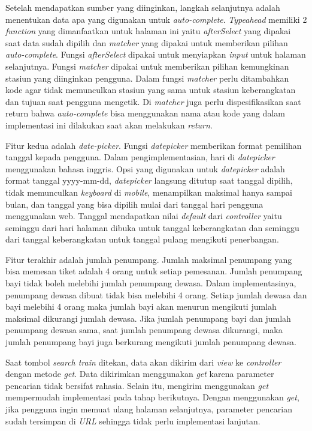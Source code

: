 Setelah mendapatkan sumber yang diinginkan, langkah selanjutnya adalah menentukan data apa yang digunakan untuk \textit{auto-complete}. \textit{Typeahead} memiliki 2 \textit{function} yang dimanfaatkan untuk halaman ini yaitu \textit{afterSelect} yang dipakai saat data sudah dipilih dan \textit{matcher} yang dipakai untuk memberikan pilihan \textit{auto-complete}. Fungsi \textit{afterSelect} dipakai untuk menyiapkan \textit{input} untuk halaman selanjutnya. Fungsi \textit{matcher} dipakai untuk memberikan pilihan kemungkinan stasiun yang diinginkan pengguna. Dalam fungsi \textit{matcher} perlu ditambahkan kode agar tidak memunculkan stasiun yang sama untuk stasiun keberangkatan dan tujuan saat pengguna mengetik. Di \textit{matcher} juga perlu dispesifikasikan saat return bahwa \textit{auto-complete} bisa menggunakan nama atau kode yang dalam implementasi ini dilakukan saat akan melakukan \textit{return}.

Fitur kedua adalah \textit{date-picker}. Fungsi \textit{datepicker} memberikan format pemilihan tanggal kepada pengguna. Dalam pengimplementasian, hari di \textit{datepicker} menggunakan bahasa inggris. Opsi yang digunakan untuk \textit{datepicker} adalah format tanggal yyyy-mm-dd, \textit{datepicker} langsung ditutup saat tanggal dipilih, tidak memunculkan \textit{keyboard} di \textit{mobile}, menampilkan maksimal hanya sampai bulan, dan tanggal yang bisa dipilih mulai dari tanggal hari pengguna menggunakan web. Tanggal mendapatkan nilai \textit{default} dari \textit{controller} yaitu seminggu dari hari halaman dibuka untuk tanggal keberangkatan dan seminggu dari tanggal keberangkatan untuk tanggal pulang mengikuti penerbangan.

Fitur terakhir adalah jumlah penumpang. Jumlah maksimal penumpang yang bisa memesan tiket adalah 4 orang untuk setiap pemesanan. Jumlah penumpang bayi tidak boleh melebihi jumlah penumpang dewasa. Dalam implementasinya, penumpang dewasa dibuat tidak bisa melebihi 4 orang. Setiap jumlah dewasa dan bayi melebihi 4 orang maka jumlah bayi akan menurun mengikuti jumlah maksimal dikurangi jumlah dewasa. Jika jumlah penumpang bayi dan jumlah penumpang dewasa sama, saat jumlah penumpang dewasa dikurangi, maka jumlah penumpang bayi juga berkurang mengikuti jumlah penumpang dewasa.

Saat tombol \textit{search train} ditekan, data akan dikirim dari \textit{view} ke \textit{controller} dengan metode \textit{get}. Data dikirimkan menggunakan \textit{get} karena parameter pencarian tidak bersifat rahasia. Selain itu, mengirim menggunakan \textit{get} mempermudah implementasi pada tahap berikutnya. Dengan menggunakan \textit{get}, jika pengguna ingin memuat ulang halaman selanjutnya, parameter pencarian sudah tersimpan di \textit{URL} sehingga tidak perlu implementasi lanjutan.

